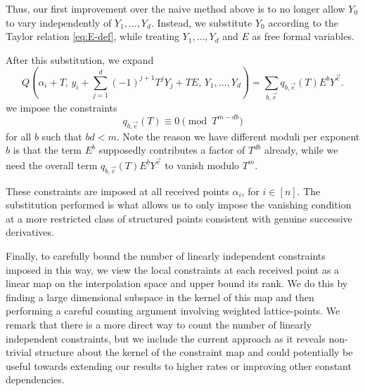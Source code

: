 \documentclass[11pt]{article}
\begin{document}
Thus, our first improvement over the naive method above is to no longer allow
$Y_0$ to vary independently of $Y_1,\ldots,Y_d$. Instead, we substitute
$Y_0$ according to the Taylor relation \eqref{eq:E-def}, while treating $Y_1,\ldots,Y_d$ and $E$ as free formal variables.

After this substitution, we expand
\[
Q\left(
\alpha_i+T,\,
y_i+\sum_{j=1}^d(-1)^{j+1}T^jY_j+TE,\,
Y_1,\ldots,Y_d
\right) =
\sum_{b,\vec{e}}q_{b,\vec{e}}(T)E^bY^{\vec{e}}.
\]
we impose the constraints
\begin{equation}
q_{b,\vec{e}}(T)\equiv0\pmod{T^{m-db}}
\end{equation}
for all $b$ such that $bd < m$. Note the reason we have different moduli per exponent $b$ is that the term $E^b$ supposedly contributes a factor of $T^{db}$ already, while we need the overall term $q_{b,\vec{e}}(T)E^bY^{\vec{e}}$ to vanish modulo $T^m$.

These constraints are imposed at all received points $\alpha_i$, for $i \in [n]$. The substitution performed is what allows us to only impose the vanishing condition at a more restricted class of structured points consistent with genuine successive derivatives.

Finally, to carefully bound the number of linearly independent constraints
imposed in this way, we view the local constraints at each received point as
a linear map on the interpolation space and upper bound its rank.  We do this by finding a large dimensional subspace in the kernel of this map and then performing a careful counting argument involving weighted lattice-points. We remark that there is a more direct way to count the number of linearly independent constraints, but we include the current approach as it reveals non-trivial structure about the kernel of the constraint map and could potentially be useful towards extending our results to higher rates or improving other constant dependencies.
\end{document}
